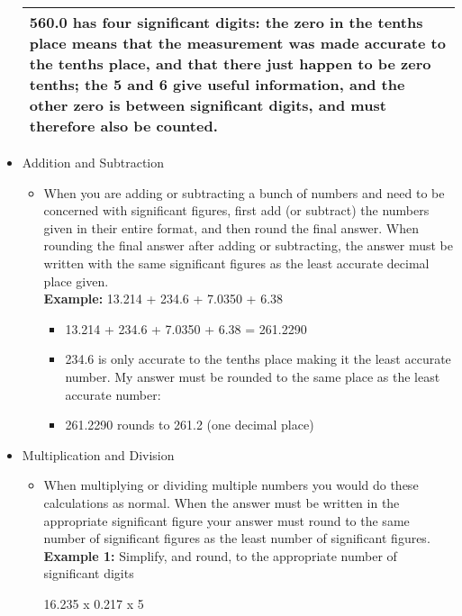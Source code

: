 \begin{itemize}
\begin{table}[h]
\begin{tabular}{|p{16cm}|}
\scriptsize{560.0 has four significant   digits: the zero in the tenths place means that the measurement was made   accurate to the tenths place, and that there just happen to be zero tenths;   the 5 and 6 give useful information, and the other zero is between   significant digits, and must therefore also be counted.} \\ \hline
\end{tabular}
\end{table}
\item Addition and Subtraction\\
\begin{itemize}
\item When you are adding or subtracting a bunch of numbers and need to be concerned with significant figures, first add (or subtract) the numbers given in their entire format, and then round the final answer. When rounding the final answer after adding or subtracting, the answer must be written with the same significant figures as the least accurate decimal place given.\\
\textbf{Example:} 13.214 + 234.6 + 7.0350 + 6.38\\
\begin{itemize}
\item 13.214 + 234.6 + 7.0350 + 6.38 = 261.2290\\
\item 234.6 is only accurate to the tenths place making it the least accurate number. My answer must be rounded to the same place as the least accurate number:\\
\item 261.2290 rounds to 261.2 (one decimal place)\\
\end{itemize}
\end{itemize}
\item Multiplication and Division\\
\begin{itemize}
\item When multiplying or dividing multiple numbers you would do these calculations as normal. When the answer must be written in the appropriate significant figure your answer must round to the same number of significant figures as the least number of significant figures.\\
\textbf{Example 1:}  Simplify, and round, to the appropriate number of significant digits \\
\begin{center}
16.235 x 0.217 x 5\\

\end{center}
\end{itemize}
\end{itemize}
